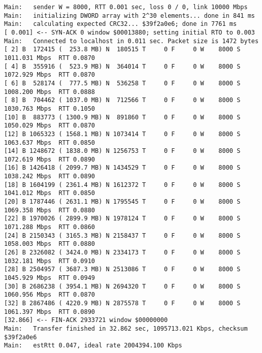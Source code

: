 \documentclass[11pt]{article}
\begin{document}
\begin{enumerate}
{\begin{lstlisting}[label=app-trace,caption={Dummy trace for $W=8000$ and 1,472 byte packets}]
Main:   sender W = 8000, RTT 0.001 sec, loss 0 / 0, link 10000 Mbps
Main:   initializing DWORD array with 2^30 elements... done in 841 ms
Main:   calculating expected CRC32... $39f2a0e6; done in 7761 ms
[ 0.001] <-- SYN-ACK 0 window $00013880; setting initial RTO to 0.003
Main:   Connected to localhost in 0.011 sec. Packet size is 1472 bytes
[ 2] B  172415 (  253.8 MB) N  180515 T     0 F     0 W    8000 S  1011.031 Mbps  RTT 0.0870
[ 4] B  355916 (  523.9 MB) N  364014 T     0 F     0 W    8000 S  1072.929 Mbps  RTT 0.0870
[ 6] B  528174 (  777.5 MB) N  536258 T     0 F     0 W    8000 S  1008.200 Mbps  RTT 0.0888
[ 8] B  704462 ( 1037.0 MB) N  712566 T     0 F     0 W    8000 S  1030.763 Mbps  RTT 0.1050
[10] B  883773 ( 1300.9 MB) N  891860 T     0 F     0 W    8000 S  1050.029 Mbps  RTT 0.0870
[12] B 1065323 ( 1568.1 MB) N 1073414 T     0 F     0 W    8000 S  1063.637 Mbps  RTT 0.0850
[14] B 1248672 ( 1838.0 MB) N 1256753 T     0 F     0 W    8000 S  1072.619 Mbps  RTT 0.0890
[16] B 1426418 ( 2099.7 MB) N 1434529 T     0 F     0 W    8000 S  1038.242 Mbps  RTT 0.0890
[18] B 1604199 ( 2361.4 MB) N 1612372 T     0 F     0 W    8000 S  1041.012 Mbps  RTT 0.0850
[20] B 1787446 ( 2631.1 MB) N 1795545 T     0 F     0 W    8000 S  1069.358 Mbps  RTT 0.0880
[22] B 1970026 ( 2899.9 MB) N 1978124 T     0 F     0 W    8000 S  1071.288 Mbps  RTT 0.0860
[24] B 2150343 ( 3165.3 MB) N 2158437 T     0 F     0 W    8000 S  1058.003 Mbps  RTT 0.0880
[26] B 2326082 ( 3424.0 MB) N 2334173 T     0 F     0 W    8000 S  1032.181 Mbps  RTT 0.0910
[28] B 2504957 ( 3687.3 MB) N 2513086 T     0 F     0 W    8000 S  1045.929 Mbps  RTT 0.0949
[30] B 2686238 ( 3954.1 MB) N 2694320 T     0 F     0 W    8000 S  1060.956 Mbps  RTT 0.0870
[32] B 2867486 ( 4220.9 MB) N 2875578 T     0 F     0 W    8000 S  1061.397 Mbps  RTT 0.0890
[32.866] <-- FIN-ACK 2933721 window $00000000
Main:   Transfer finished in 32.862 sec, 1095713.021 Kbps, checksum $39f2a0e6
Main:   estRtt 0.047, ideal rate 2004394.100 Kbps
\end{lstlisting}

}
\end{enumerate}
\end{document}
